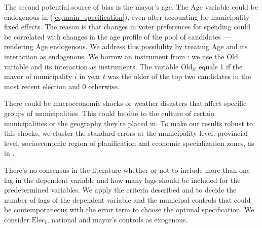 The second potential source of bias is the mayor’s age. The Age variable could be endogenous in (\ref{eq:main_specification}), even after accounting for municipality fixed effects. The reason is that changes in voter preferences for spending could be correlated with changes in the age profile of the pool of candidates —rendering Age endogenous. We address this possibility by treating Age and its interaction as endogenous. We borrow an instrument from \textcite{alesina2018}: we use the Old variable and its interaction as instruments. The variable $\text{Old}_{it}$ equals 1 if the mayor of municipality $i$ in year $t$ was the older of the top two candidates in the most recent election and 0 otherwise. 

There could be macroeconomic shocks or weather disasters that affect specific groups of municipalities. This could be due to the culture of certain municipalities or the geography they're placed in. To make our results robust to this shocks, we cluster the standard errors at the municipality level, provincial level, socioeconomic region of planification and economic specialization zones, as in \textcite{alfaro2019}. 

There's no consensus in the literature whether or not to include more than one lag in the dependent variable and how many lags should be included for the predetermined variables. We apply the criteria described \textcite{kripfganz2019} and \textcite{kiviet2020} to decide the number of lags of the dependent variable and the municipal controls that could be contemporaneous with the error term to choose the optimal specification. We consider $\text{Elec}_t$, national and mayor's controls as exogenous. 
